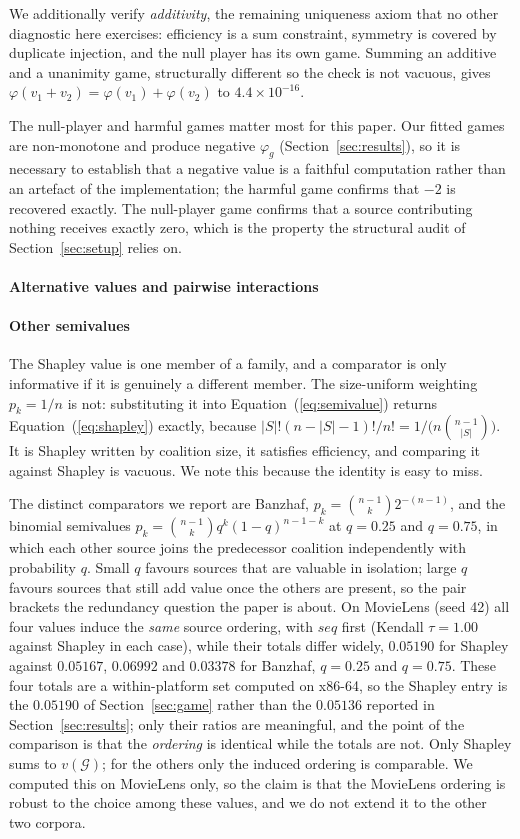 \documentclass[pdflatex,sn-basic,Numbered]{sn-jnl}
\theoremstyle{plain}
\theoremstyle{definition}
\newcommand{\G}{\mathcal{G}}
\begin{document}
We additionally verify \emph{additivity}, the remaining uniqueness axiom that
no other diagnostic here exercises: efficiency is a sum constraint, symmetry is
covered by duplicate injection, and the null player has its own game. Summing an additive and a unanimity game, structurally different so the check is not vacuous, gives $\varphi(v_1 + v_2) = \varphi(v_1) + \varphi(v_2)$ to
$4.4\times10^{-16}$.

The null-player and harmful games matter most for this paper. Our fitted games
are non-monotone and produce negative $\varphi_g$ (Section~\ref{sec:results}),
so it is necessary to establish that a negative value is a faithful computation
rather than an artefact of the implementation; the harmful game confirms that
$-2$ is recovered exactly. The null-player game confirms that a source
contributing nothing receives exactly zero, which is the property the
structural audit of Section~\ref{sec:setup} relies on.

\paragraph{Alternative values and pairwise interactions}\label{sec:alternatives}

\paragraph{Other semivalues}
The Shapley value is one member of a family, and a comparator is only
informative if it is genuinely a different member. The size-uniform weighting
$p_k = 1/n$ is not: substituting it into Equation~(\ref{eq:semivalue}) returns
Equation~(\ref{eq:shapley}) exactly, because
$|S|!(n-|S|-1)!/n! = 1/\bigl(n\binom{n-1}{|S|}\bigr)$. It is Shapley written by
coalition size, it satisfies efficiency, and comparing it against Shapley is
vacuous. We note this because the identity is easy to miss.

The distinct comparators we report are Banzhaf, $p_k =
\binom{n-1}{k}2^{-(n-1)}$, and the binomial semivalues $p_k =
\binom{n-1}{k}q^k(1-q)^{n-1-k}$ at $q = 0.25$ and $q = 0.75$, in which each
other source joins the predecessor coalition independently with probability
$q$. Small $q$ favours sources that are valuable in isolation; large $q$
favours sources that still add value once the others are present, so the pair
brackets the redundancy question the paper is about. On MovieLens (seed 42) all
four values induce the \emph{same} source ordering, with $seq$ first
(Kendall $\tau = 1.00$ against Shapley in each case), while their totals differ
widely, $0.05190$ for Shapley against $0.05167$, $0.06992$ and $0.03378$ for
Banzhaf, $q=0.25$ and $q=0.75$. These four totals are a within-platform set
computed on x86-64, so the Shapley entry is the $0.05190$ of
Section~\ref{sec:game} rather than the $0.05136$ reported in
Section~\ref{sec:results}; only
their ratios are meaningful, and the point of the comparison is that the
\emph{ordering} is identical while the totals are not. Only Shapley sums to $v(\G)$; for the others
only the induced ordering is comparable. We computed this on MovieLens only, so
the claim is that the MovieLens ordering is robust to the choice among these
values, and we do not extend it to the other two corpora.
\end{document}
